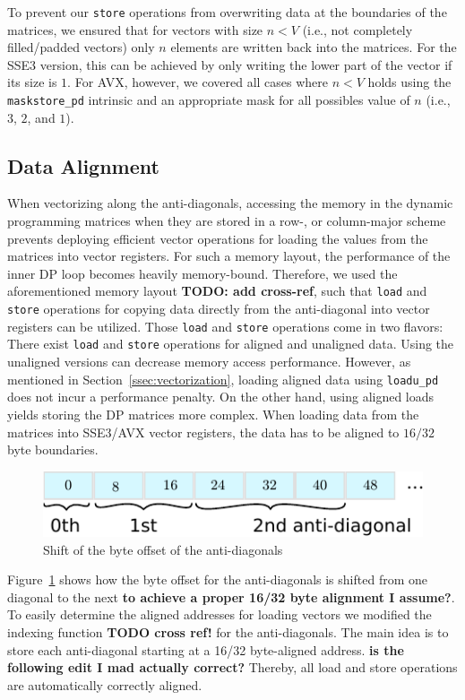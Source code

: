 \documentclass[runningheads,a4paper]{llncs}
\begin{document}
To prevent our \texttt{store} operations from overwriting data at the boundaries
of the matrices, we ensured that for vectors with size $n < V$ (i.e.,
not completely filled/padded vectors) only $n$ elements are written back into the
matrices.  For the SSE3 version, this can be achieved by only writing the lower
part of the vector if its size is $1$.  For AVX, however, we covered all cases
where $n < V$ holds using the \texttt{maskstore\_pd} intrinsic and an appropriate mask
for all possibles value of $n$ (i.e., $3$, $2$, and $1$).

\subsection{Data Alignment}
\label{ssec:dataalignment}

When vectorizing along the anti-diagonals, accessing the memory in the dynamic programming matrices when they are stored in a row-, or column-major scheme 
prevents deploying efficient vector operations for loading the values from the matrices into vector registers. 
For such a memory layout, the performance of the inner DP loop becomes heavily memory-bound. 
Therefore, we used the aforementioned memory layout {\bf TODO: add cross-ref}, such that \texttt{load} and \texttt{store} operations for copying data directly from the anti-diagonal 
into vector registers can be utilized. 
Those \texttt{load} and \texttt{store} operations come in two flavors: There exist \texttt{load} and \texttt{store} operations for aligned and unaligned data. 
Using the unaligned versions can decrease memory access performance. However, 
as mentioned in Section~\ref{ssec:vectorization}, loading aligned data using \texttt{loadu\_pd} does not incur a performance penalty. 
On the other hand, using aligned loads yields storing the DP matrices more complex. 
When loading data from the matrices into SSE3/AVX vector registers, the data has to be aligned to $16/32$ byte boundaries.

\begin{figure}[ht!]
  \centering
  \includegraphics[scale=0.9]{figures/unaligned.pdf}
  \caption{Shift of the byte offset of the anti-diagonals}
  \label{fig:unaligned}
\end{figure}

Figure~\ref{fig:unaligned} shows how the byte offset for the anti-diagonals is shifted from one diagonal to the next {\bf to achieve a proper 16/32 byte alignment I assume?}.
To easily determine the aligned addresses for loading vectors we modified the indexing function {\bf TODO cross ref!} for the anti-diagonals. 
The main idea is to store each anti-diagonal starting at a 16/32 byte-aligned address. {\bf is the following edit I mad actually correct?} Thereby, all load and store operations are automatically correctly aligned.
\end{document}
